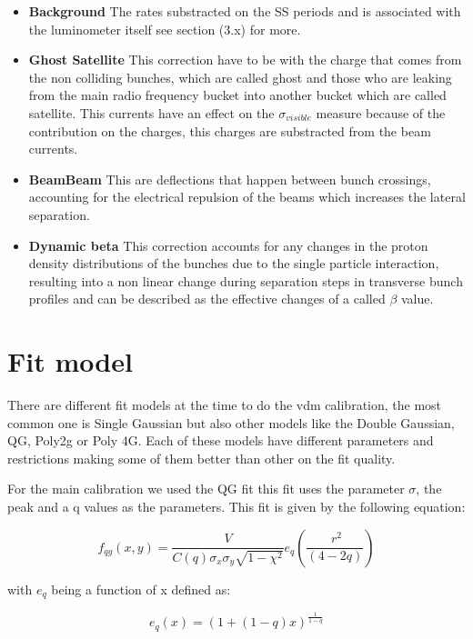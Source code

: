 \begin{itemize}
  \item \textbf{Background} The rates substracted on the SS periods and is associated with the luminometer itself see section (3.x) for more.
  \item \textbf {Ghost Satellite} This correction have to be with the charge that comes from the non colliding bunches, which are called ghost and those who are leaking from the main radio frequency bucket into another bucket which are called satellite. This currents have an effect on the $\sigma_{visible}$ measure because of the contribution on the charges, this charges are substracted from the beam currents.  \cite{ghost}
  \item \textbf{BeamBeam} This are deflections that happen between bunch crossings, accounting for the electrical repulsion of the beams which increases the lateral separation.   \cite{beambeam}
  \item \textbf{Dynamic beta} This correction accounts for any changes in the proton density distributions of the bunches due to the single particle interaction, resulting into a non linear change during separation steps in transverse bunch profiles and can be described as the effective changes of a called $\beta$ value. \cite{LHClum}
\end{itemize}


\section{Fit model} 

There are different fit models at the time to do the vdm calibration, the most common one is Single Gaussian but also other models like the Double Gaussian, QG, Poly2g or Poly 4G. Each of these models have different parameters and restrictions making some of them better than other on the fit quality. 

For the main calibration we used the QG fit this fit uses the parameter $\sigma$, the peak and a q values as the parameters. This fit is given by the following equation:


\begin{equation}
f_{qg}(x,y) = \frac{V}{C(q) \sigma_{x} \sigma_{y}\sqrt{1-\chi^{2}}} e_{q}(\frac{\ r^{2}}{(4-2q)}) 
\end{equation}

with $e_{q}$ being a function of x defined as: 

\begin{equation}
e_{q}(x) = (1+(1-q)x)^{\frac{1}{1-q}}
\end{equation}

